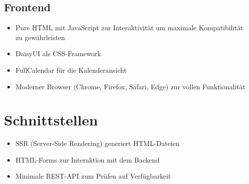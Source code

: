 \subsection{Frontend}

\begin{itemize}
    \item Pure HTML mit JavaScript zur Interaktivität um maximale Kompatibilität zu gewährleisten
    \item DaisyUI als CSS-Framework
    \item FullCalendar für die Kalenderansicht
    \item Moderner Browser (Chrome, Firefox, Safari, Edge) zur vollen Funktionalität
\end{itemize}

\section{Schnittstellen}

\begin{itemize}
    \item SSR (Server-Side Rendering) generiert HTML-Dateien
    \item HTML-Forms zur Interaktion mit dem Backend
    \item Minimale REST-API zum Prüfen auf Verfügbarkeit
\end{itemize}